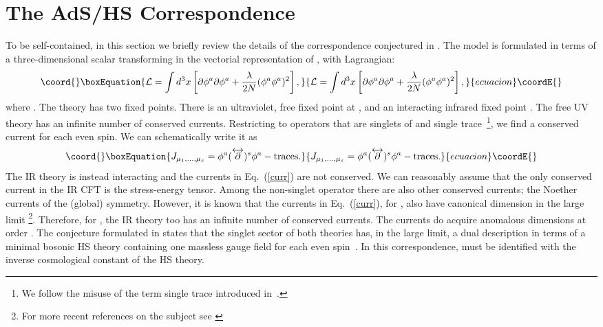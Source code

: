 \documentclass[a4paper,12pt]{article}
\begin{document}
\section{The AdS/HS Correspondence}
To be self-contained, 
in this section we  briefly review the details of the correspondence 
conjectured in \cite{kp}. 
The \coordHE{} model is formulated in terms of a three-dimensional
scalar transforming in the vectorial representation of \coordHE{}, with
Lagrangian:
\begin{equation}\coord{}\boxEquation{
  {\cal L}=\int d^3x \left [\partial \phi^a \partial \phi^a +
{\lambda\over 2N}(\phi^a\phi^a)^2\right],
\label{lag}
}{
  {\cal L}=\int d^3x \left [\partial \phi^a \partial \phi^a +
{\lambda\over 2N}(\phi^a\phi^a)^2\right],
}{ecuacion}\coordE{}\end{equation}
where \coordHE{}. The theory has two fixed points. There is an
ultraviolet, free fixed point at \coordHE{}, and an interacting
infrared fixed point \cite{wilson}. The free UV theory has an infinite
number of conserved currents.  Restricting to operators that are
singlets of \coordHE{} and single trace~\footnote{We follow the misuse of
the term single trace introduced in~\cite{kp}.}, we find a conserved
current for each even spin. We can schematically write it as
\begin{equation}\coord{}\boxEquation{
J_{\mu_1,...,\mu_s}=\phi^a (\overleftrightarrow{\partial})^s\phi^a- 
\mbox{traces}.
\label{curr}
}{
J_{\mu_1,...,\mu_s}=\phi^a (\overleftrightarrow{\partial})^s\phi^a- 
\mbox{traces}.
}{ecuacion}\coordE{}\end{equation}
The IR theory is instead interacting and the currents in
Eq.~(\ref{curr}) are not conserved. We can reasonably assume that the
only conserved current in the IR CFT is the stress-energy
tensor. Among the non-singlet operator there are also other conserved
currents; the Noether currents of the (global) \coordHE{} symmetry.
However, it is known \cite{wilson} that the currents in
Eq.~(\ref{curr}), for \coordHE{}, also have canonical dimension in the
large \coordHE{} limit
\footnote{For more recent references on the subject see \cite{on}}.
Therefore, for \coordHE{}, the IR theory too has an infinite number of
conserved currents. The currents do acquire anomalous dimensions at
order \coordHE{}. The conjecture formulated in \cite{kp} states that the
singlet sector of both theories has, in the large \coordHE{} limit, a dual
description in terms of a minimal bosonic HS theory containing one
massless gauge field for each even spin~\cite{v}. In this
correspondence, \coordHE{} must be identified with the inverse cosmological
constant of the HS theory.
\end{document}
